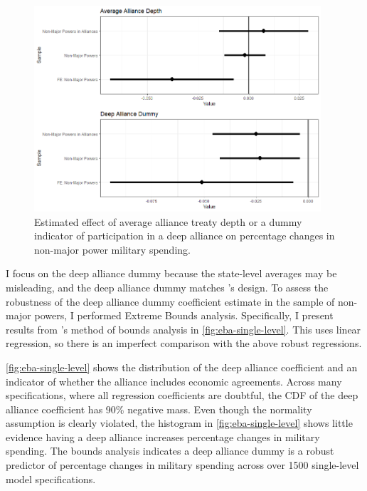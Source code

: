 \documentclass[12pt]{article}
\begin{document}
\begin{figure}[htbp]
	\centering
		\includegraphics[width=0.95\textwidth]{single-level-mplot.png}
	\caption{Estimated effect of average alliance treaty depth or a dummy indicator of participation in a deep alliance on percentage changes in non-major power military spending.}
	\label{fig:single-level-mplot}
\end{figure}


I focus on the deep alliance dummy because the state-level averages may be misleading, and the deep alliance dummy matches \citep{DigiuseppePoast2016}'s design.
To assess the robustness of the deep alliance dummy coefficient estimate in the sample of non-major powers, I performed Extreme Bounds analysis. 
Specifically, I present results from \citet{Sala-i-Martin1997}'s method of bounds analysis in \autoref{fig:eba-single-level}. 
This uses linear regression, so there is an imperfect comparison with the above robust regressions. 


\autoref{fig:eba-single-level} shows the distribution of the deep alliance coefficient and an indicator of whether the alliance includes economic agreements. 
Across many specifications, where all regression coefficients are doubtful, the CDF of the deep alliance coefficient has 90\% negative mass. 
Even though the normality assumption is clearly violated, the histogram in \autoref{fig:eba-single-level} shows little evidence having a deep alliance increases percentage changes in military spending. 
The bounds analysis indicates a deep alliance dummy is a robust predictor of percentage changes in military spending across over 1500 single-level model specifications. 
\end{document}
